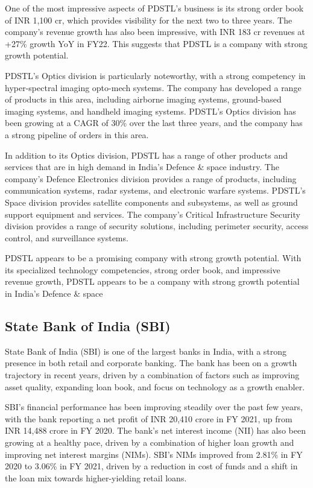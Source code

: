One of the most impressive aspects of PDSTL's business is its strong order book of INR 1,100 cr, which provides visibility for the next two to three years. The company's revenue growth has also been impressive, with INR 183 cr revenues at +27\% growth YoY in FY22. This suggests that PDSTL is a company with strong growth potential.

PDSTL's Optics division is particularly noteworthy, with a strong competency in hyper-spectral imaging opto-mech systems. The company has developed a range of products in this area, including airborne imaging systems, ground-based imaging systems, and handheld imaging systems. PDSTL's Optics division has been growing at a CAGR of 30\% over the last three years, and the company has a strong pipeline of orders in this area.

In addition to its Optics division, PDSTL has a range of other products and services that are in high demand in India's Defence \& space industry. The company's Defence Electronics division provides a range of products, including communication systems, radar systems, and electronic warfare systems. PDSTL's Space division provides satellite components and subsystems, as well as ground support equipment and services. The company's Critical Infrastructure Security division provides a range of security solutions, including perimeter security, access control, and surveillance systems.

PDSTL appears to be a promising company with strong growth potential. With its specialized technology competencies, strong order book, and impressive revenue growth, PDSTL appears to be a company with strong growth potential in India's Defence \& space

    \subsection{State Bank of India (SBI)} State Bank of India (SBI) is one of the largest banks in India, with a strong presence in both retail and corporate banking. The bank has been on a growth trajectory in recent years, driven by a combination of factors such as improving asset quality, expanding loan book, and focus on technology as a growth enabler.
    
SBI's financial performance has been improving steadily over the past few years, with the bank reporting a net profit of INR 20,410 crore in FY 2021, up from INR 14,488 crore in FY 2020. The bank's net interest income (NII) has also been growing at a healthy pace, driven by a combination of higher loan growth and improving net interest margins (NIMs). SBI's NIMs improved from 2.81\% in FY 2020 to 3.06\% in FY 2021, driven by a reduction in cost of funds and a shift in the loan mix towards higher-yielding retail loans.

